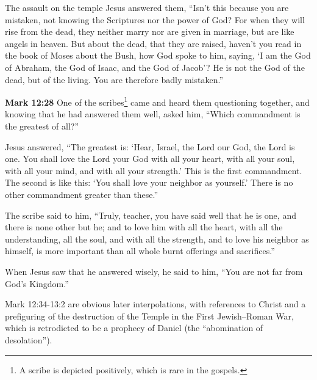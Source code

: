 \documentclass[10pt,twoside]{book}
\newcommand{\quotesize}{\normalsize{}}
\newcommand{\comm}[1]{\begingroup \color{black!50} #1\endgroup}
\newenvironment{quotetext}{\begingroup\quotesize}{\endgroup}
\newcommand{\bible}[2]{\begin{quotetext}\textbf{#1} #2\end{quotetext}}
\newcommand{\gospelmark}[2]{\bible{Mark #1}{#2}}
\begin{document}
\begin{section}{The assault on the temple}
{  Jesus answered them, ``Isn't this because you are mistaken, not knowing the Scriptures nor the power of God?    For when they will rise from the dead, they neither marry nor are given in marriage, but are like angels in heaven.    But about the dead, that they are raised, haven't you read in the book of Moses about the Bush, how God spoke to him, saying, `I am the God of Abraham, the God of Isaac, and the God of Jacob'?    He is not the God of the dead, but of the living. You are therefore badly mistaken.'' 
}

\gospelmark{12:28}{
One of the scribes\footnote{A scribe is depicted positively, which is rare in the gospels.} came and heard them questioning together, and knowing that he had answered them well, asked him, ``Which commandment is the greatest of all?''

  Jesus answered, ``The greatest is: `Hear, Israel, the Lord our God, the Lord is one.    You shall love the Lord your God with all your heart, with all your soul, with all your mind, and with all your strength.' This is the first commandment.    The second is like this: `You shall love your neighbor as yourself.' There is no other commandment greater than these.''

  The scribe said to him, ``Truly, teacher, you have said well that he is one, and there is none other but he;   and to love him with all the heart, with all the understanding, all the soul, and with all the strength, and to love his neighbor as himself, is more important than all whole burnt offerings and sacrifices.''

  When Jesus saw that he answered wisely, he said to him, ``You are not far from God's Kingdom.'' 
}

\comm{Mark 12:34-13:2 are obvious later interpolations, with references to Christ and a prefiguring of the destruction of the
Temple in the First Jewish–Roman War, which is retrodicted to be a prophecy of Daniel (the ``abomination of desolation'').}

\end{section}
\end{document}
